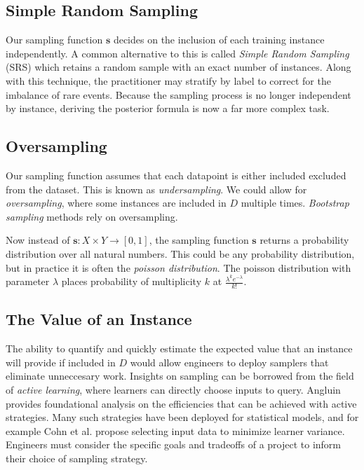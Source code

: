 \documentclass[twoside]{article}
\begin{document}
\subsection{Simple Random Sampling}

Our sampling function \(\mathbf{s}\) decides on the inclusion of each training instance independently. A common alternative to this is called \textit{Simple Random Sampling} (SRS) which retains a random sample with an exact number of instances. Along with this technique, the practitioner may stratify by label to correct for the imbalance of rare events. Because the sampling process is no longer independent by instance, deriving the posterior formula is now a far more complex task.

\subsection{Oversampling}

Our sampling function assumes that each datapoint is either included excluded from the dataset. This is known as \textit{undersampling}. We could allow for \textit{oversampling}, where some instances are included in \(D\) multiple times. \textit{Bootstrap sampling} methods rely on oversampling.

Now instead of \(\mathbf{s}: X \times Y \rightarrow \left [ 0, 1\right ]\), the sampling function \(\mathbf{s}\) returns a probability distribution over all natural numbers. This could be any probability distribution, but in practice it is often the \textit{poisson distribution}. The poisson distribution with parameter \(\lambda\) places probability of multiplicity \(k\) at \(\frac{\lambda^k e^{-\lambda}}{k!}\).

\subsection{The Value of an Instance}

The ability to quantify and quickly estimate the expected value that an instance will provide if included in \(D\) would allow engineers to deploy samplers that eliminate unneccesary work. Insights on sampling can be borrowed from the field of \textit{active learning}, where learners can directly choose inputs to query. Angluin\cite{angluin} provides foundational analysis on the efficiencies that can be achieved with active strategies. Many such strategies have been deployed for statistical models, and for example Cohn et al.\cite{active} propose selecting input data to minimize learner variance. Engineers must consider the specific goals and tradeoffs of a project to inform their choice of sampling strategy.
\end{document}
